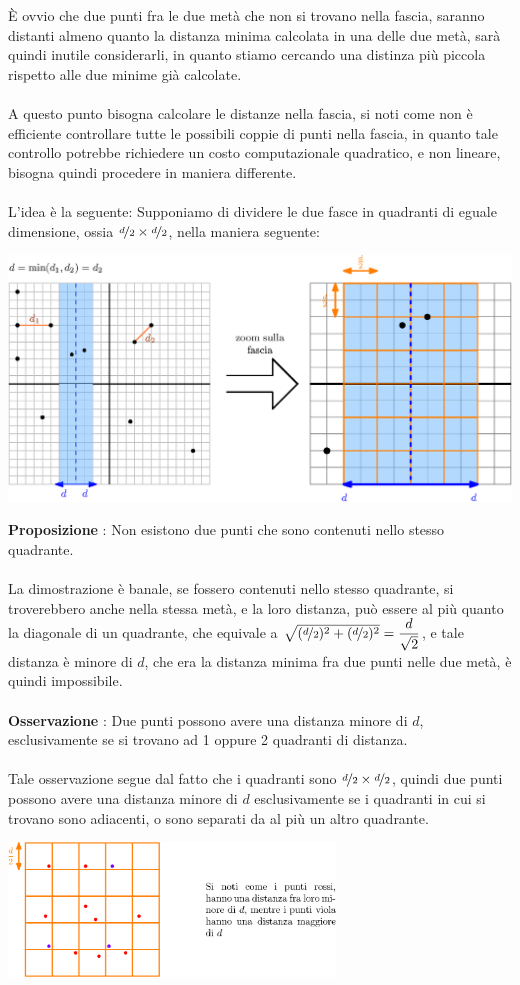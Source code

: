 \documentclass[12pt, letterpaper]{article}
\newcommand{\acc}{\\\hphantom{}\\}
\begin{document}
È ovvio che due punti fra le due metà che non si trovano nella fascia, saranno distanti almeno quanto la distanza minima
calcolata in una delle due metà, sarà quindi inutile considerarli, in quanto stiamo cercando una distinza più piccola
rispetto alle due minime già calcolate.\acc
A questo punto bisogna calcolare le distanze nella fascia, si noti come non è efficiente controllare tutte le possibili coppie
di punti nella fascia, in quanto tale controllo potrebbe richiedere un costo computazionale quadratico, e non lineare,
bisogna quindi procedere in maniera differente.\acc
L'idea è la seguente: Supponiamo di dividere le due fasce in quadranti di eguale dimensione, ossia
$\nicefrac{d}{2}\times \nicefrac{d}{2}$, nella maniera seguente:\begin{center}
    \includegraphics[width=1\textwidth ]{images/distMin2.eps}
\end{center}
\textbf{Proposizione} : Non esistono due punti che sono contenuti nello stesso quadrante.\acc
La dimostrazione è banale, se fossero contenuti nello stesso quadrante, si troverebbero anche nella
stessa metà, e la loro distanza, può essere al più quanto la diagonale di un quadrante, che equivale
a $\sqrt{(\nicefrac{d}{2})^2+(\nicefrac{d}{2})^2}=\dfrac{d}{\sqrt{2}}$, e tale distanza è minore di $d$, che era la
distanza minima fra due punti nelle due metà, è quindi impossibile.\acc
\textbf{Osservazione} : Due punti possono avere una distanza minore di $d$, esclusivamente se si trovano ad 1 oppure 2
quadranti di distanza.\acc
Tale osservazione segue dal fatto che i quadranti sono  $\nicefrac{d}{2}\times \nicefrac{d}{2}$, quindi due punti possono
avere una distanza minore di $d$ esclusivamente se i quadranti in cui si trovano sono adiacenti, o sono separati da
al più un altro quadrante.\begin{center}
    \includegraphics[width=0.65\textwidth ]{images/distMin3.eps}
\end{center}
\end{document}
